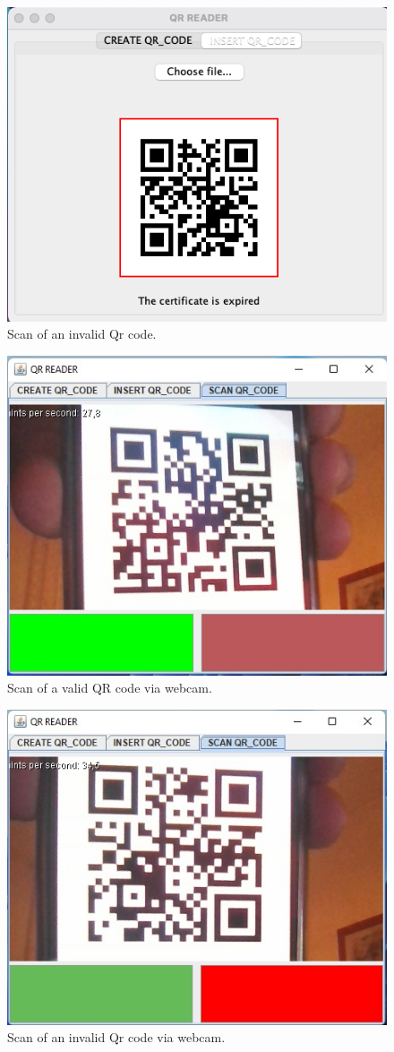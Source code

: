 \documentclass[12pt, a4paper]{article}
\begin{document}
\begin{figure}[h]
    \centering
    \includegraphics[width=.6\linewidth]{app_4.png}
    \caption*{Scan of an invalid Qr code.} %
\end{figure}
\begin{figure}[h]
    \centering
    \includegraphics[width=.6\linewidth]{app_5.png}
    \caption*{Scan of a valid QR code via webcam.} %
\end{figure}
\begin{figure}[h]
    \centering
    \includegraphics[width=.6\linewidth]{app_6.png}
    \caption*{Scan of an invalid Qr code via webcam.} %
\end{figure}
\end{document}
